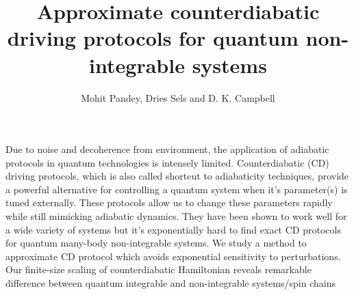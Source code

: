 \documentclass[11pt,a4paper]{article}
\author{Mohit Pandey, Dries Sels and D. K. Campbell}
\title{Approximate counterdiabatic driving protocols for quantum non-integrable systems  }
\begin{document}
\maketitle


Due to noise and decoherence from environment, the application of adiabatic protocols in quantum technologies is intensely limited. Counterdiabatic (CD) driving protocols, which is also called shortcut to adiabaticity techniques, provide a powerful alternative for controlling a quantum system when it's parameter(s) is tuned externally. These protocols allow us to change these parameters rapidly while still mimicking adiabatic dynamics. They have been shown to work well for a wide variety of systems but it's exponentially hard to find exact CD protocols for quantum many-body non-integrable systems. We study a method to approximate CD protocol which avoids exponential sensitivity to perturbations. Our finite-size scaling of counterdiabatic Hamiltonian reveals remarkable difference between quantum integrable and non-integrable systems/spin chains


 



 


%
\end{document}
